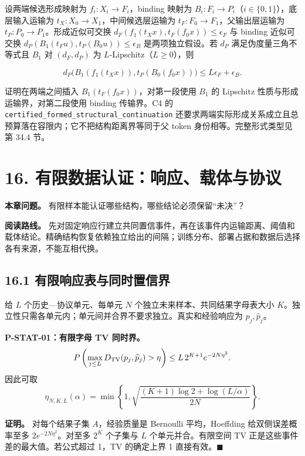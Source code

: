 \documentclass[
  11pt,
  oneside]{book}
\begin{document}
设两端候选形成映射为 \(f_i:X_i\to F_i\)，binding 映射为 \(B_i:F_i\to P_i\)（\(i\in\{0,1\}\)），底层输入运输为 \(t_X:X_0\to X_1\)，中间候选层运输为 \(t_F:F_0\to F_1\)，父输出层运输为 \(t_P:P_0\to P_1\)。形成近似可交换 \(d_F(f_1(t_Xx),t_F(f_0x))\le\epsilon_F\) 与 binding 近似可交换 \(d_P(B_1(t_Fu),t_P(B_0u))\le\epsilon_B\) 是两项独立假设。若 \(d_P\) 满足伪度量三角不等式且 \(B_1\) 对 \((d_F,d_P)\) 为 \(L\)-Lipschitz（\(L\ge0\)），则

\[d_P\bigl(B_1(f_1(t_Xx)),t_P(B_0(f_0x))\bigr)\le L\epsilon_F+\epsilon_B.\]

证明在两端之间插入 \(B_1(t_F(f_0x))\)，对第一段使用 \(B_1\) 的 Lipschitz 性质与形成运输界，对第二段使用 binding 传输界。C4 的 \nolinkurl{certified_formed_structural_continuation} 还要求两端实际形成关系成立且总预算落在容限内；它不把结构距离界等同于父 token 身份相等。完整形式类型见第 34.4 节。

\chapter{16. 有限数据认证：响应、载体与协议}\label{ch-16}

\textbf{本章问题。} 有限样本能认证哪些结构，哪些结论必须保留``未决''？

\textbf{阅读路线。} 先对固定响应行建立共同置信事件，再在该事件内运输距离、阈值和载体结论。精确结构恢复依赖独立给出的间隔；训练分布、部署占据和数据后选择各有来源，不能互相代换。

\section{16.1 有限响应表与同时置信界}\label{ux6709ux9650ux54cdux5e94ux8868ux4e0eux540cux65f6ux7f6eux4fe1ux754c}

给 \(L\) 个历史---协议单元、每单元 \(N\) 个独立未来样本、共同结果字母表大小 \(K\)。独立性只需各单元内；单元间并合界不要求独立。真实和经验响应为 \(p_j,\widehat p_j\)。

\hypertarget{p-stat-01}{}\label{p-stat-01}

\textbf{P-STAT-01：有限字母 TV 同时界。} \[P\left(\max_{j\le L}D_{\rm TV}(p_j,\widehat p_j)>\eta\right)
\le L\,2^{K+1}e^{-2N\eta^2}.\] 因此可取 \[\eta_{N,K,L}(\alpha)=
\min\left\{1,\sqrt{\frac{(K+1)\log2+\log(L/\alpha)}{2N}}\right\}.\]

\textbf{证明。} 对每个结果子集 \(A\)，经验质量是 Bernoulli 平均，Hoeffding 给双侧误差概率至多 \(2e^{-2N\eta^2}\)。对至多 \(2^K\) 个子集与 \(L\) 个单元并合。有限空间 TV 正是这些事件差的最大值。若公式超过 1，TV 的确定上界 1 直接有效。\(\blacksquare\)
\end{document}

